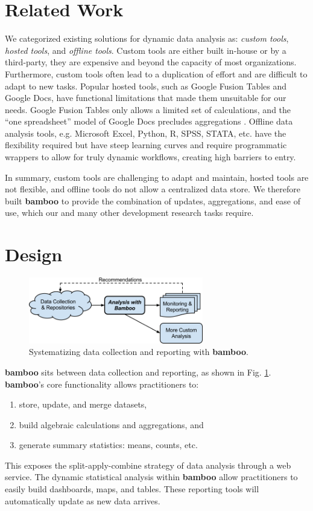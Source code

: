 \documentclass{sig-alternate}
\begin{document}
\section{Related Work}
We categorized existing solutions for dynamic data
analysis as: \emph{custom tools}, \emph{hosted tools}, and \emph{offline tools}.  Custom tools are
either built in-house or by a third-party, they are expensive and beyond the
capacity of most organizations. Furthermore, custom tools often lead to
a duplication of effort and are difficult to adapt to new tasks.  Popular hosted
tools, such as Google Fusion Tables and Google Docs, have functional limitations
that made them unsuitable for our needs.  Google Fusion Tables only allows a limited set of
calculations, and the ``one spreadsheet'' model of Google Docs precludes
aggregations \cite{gonzalez2}.  Offline data analysis tools, e.g. Microsoft Excel, Python, R, SPSS, STATA, etc. have the flexibility required but have steep learning curves and require programmatic wrappers to allow for truly dynamic workflows, creating high barriers to entry.

In summary, custom tools are challenging to adapt and maintain, hosted tools are
not flexible, and offline tools do not allow a centralized data store.
We therefore built \textbf{bamboo} to provide the combination of
updates, aggregations, and ease of use, which our and many other development research tasks
require.

\section{Design}

\begin{figure}
\centering
\includegraphics[width=3in]{figures/bamboo_flow}
\caption{Systematizing data collection and reporting with \textbf{bamboo}.}
\label{fig:flow}
\end{figure}

\textbf{bamboo} sits between data collection and reporting, as shown in Fig.
\ref{fig:flow}.
\textbf{bamboo}'s core functionality allows
practitioners to:
\begin{enumerate}
\item store, update, and merge datasets,
\item build algebraic calculations and aggregations, and
\item generate summary statistics: means, counts, etc.
\end{enumerate}
This exposes the split-apply-combine strategy of data analysis
\cite{wickham} through a web service.
The dynamic statistical analysis within \textbf{bamboo} allow practitioners to easily build
dashboards, maps, and tables.  These reporting tools will automatically update as new data
arrives.
\end{document}
